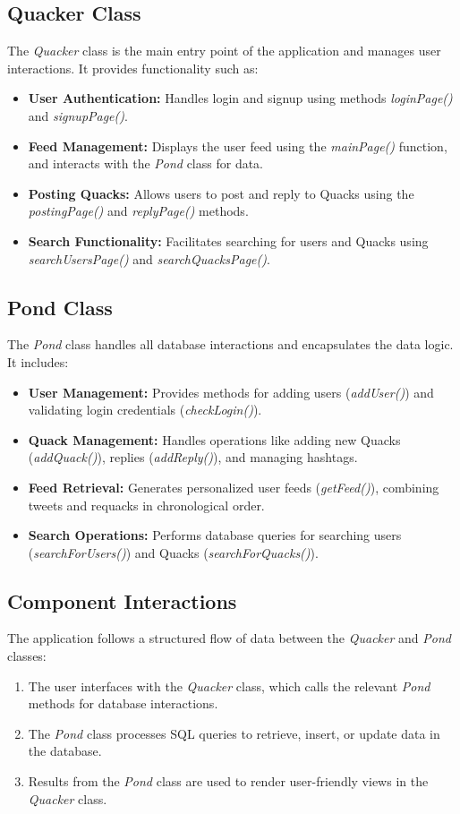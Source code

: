 \documentclass[11pt]{article}
\begin{document}
\subsection*{Quacker Class} The \textit{Quacker} class is the main entry point
of the application and manages user interactions. It provides functionality such
as: \begin{itemize} \item \textbf{User Authentication:} Handles login and signup
using methods \textit{loginPage()} and \textit{signupPage()}. \item \textbf{Feed
Management:} Displays the user feed using the \textit{mainPage()} function, and
interacts with the \textit{Pond} class for data. \item \textbf{Posting Quacks:}
Allows users to post and reply to Quacks using the \textit{postingPage()} and
\textit{replyPage()} methods. \item \textbf{Search Functionality:} Facilitates
searching for users and Quacks using \textit{searchUsersPage()} and
\textit{searchQuacksPage()}. \end{itemize}

\subsection*{Pond Class} The \textit{Pond} class handles all database
interactions and encapsulates the data logic. It includes: \begin{itemize} \item
\textbf{User Management:} Provides methods for adding users (\textit{addUser()})
and validating login credentials (\textit{checkLogin()}). \item \textbf{Quack
Management:} Handles operations like adding new Quacks (\textit{addQuack()}),
replies (\textit{addReply()}), and managing hashtags. \item \textbf{Feed
Retrieval:} Generates personalized user feeds (\textit{getFeed()}), combining
tweets and requacks in chronological order. \item \textbf{Search Operations:}
Performs database queries for searching users (\textit{searchForUsers()}) and
Quacks (\textit{searchForQuacks()}). \end{itemize}

\subsection*{Component Interactions} The application follows a structured flow
of data between the \textit{Quacker} and \textit{Pond} classes:
\begin{enumerate} \item The user interfaces with the \textit{Quacker} class,
which calls the relevant \textit{Pond} methods for database interactions. \item
The \textit{Pond} class processes SQL queries to retrieve, insert, or update
data in the database. \item Results from the \textit{Pond} class are used to
render user-friendly views in the \textit{Quacker} class. \end{enumerate}
\end{document}

